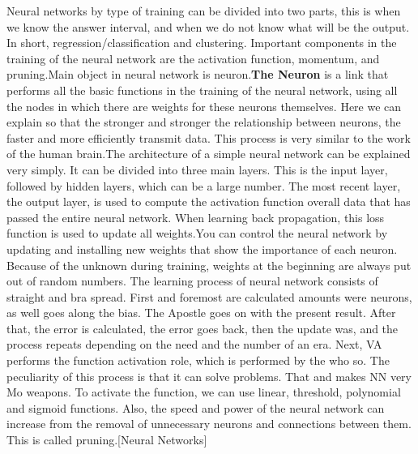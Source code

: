 Neural networks by type of training can be divided into two parts, this is when we know the answer interval, and when we do not know what will be the output. In short, regression/classification and clustering. Important components in the training of the neural network are the activation function, momentum, and pruning.Main object in neural network is neuron.\textbf{The Neuron} is a link that performs all the basic functions in the training of the neural network, using all the nodes in which there are weights for these neurons themselves. Here we can explain so that the stronger and stronger the relationship between neurons, the faster and more efficiently transmit data. This process is very similar to the work of the human brain.The architecture of a simple neural network can be explained very simply. It can be divided into three main layers. This is the input layer, followed by hidden layers, which can be a large number. The most recent layer, the output layer, is used to compute the activation function overall data that has passed the entire neural network. When learning back propagation, this loss function is used to update all weights.You can control the neural network by updating and installing new weights that show the importance of each neuron. Because of the unknown during training, weights at the beginning are always put out of random numbers. The learning process of neural network consists of straight and bra spread. First and foremost are calculated amounts were neurons, as well goes along the bias. The Apostle goes on with the present result. After that, the error is calculated, the error goes back, then the update was, and the process repeats depending on the need and the number of an era. Next, VA performs the function activation role, which is performed by the who so. The peculiarity of this process is that it can solve problems. That and makes NN very Mo weapons. To activate the function, we can use linear, threshold, polynomial and sigmoid functions. Also, the speed and power of the neural network can increase from the removal of unnecessary neurons and connections between them. This is called pruning.[Neural Networks]
\vspace{-0.3cm}

